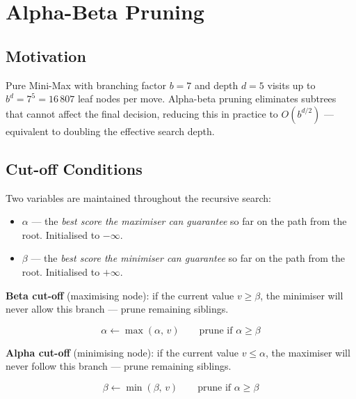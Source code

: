 \documentclass[12pt]{article}
\begin{document}
\section{Alpha-Beta Pruning}

\subsection{Motivation}

Pure Mini-Max with branching factor $b = 7$ and depth $d = 5$ visits up to
$b^d = 7^5 = 16\,807$ leaf nodes per move.  Alpha-beta pruning eliminates
subtrees that cannot affect the final decision, reducing this in practice to
$O(b^{d/2})$ --- equivalent to doubling the effective search depth.

\subsection{Cut-off Conditions}

Two variables are maintained throughout the recursive search:

\begin{itemize}
    \item $\alpha$ --- the \emph{best score the maximiser can guarantee} so
          far on the path from the root.  Initialised to $-\infty$.
    \item $\beta$  --- the \emph{best score the minimiser can guarantee} so
          far on the path from the root.  Initialised to $+\infty$.
\end{itemize}

\textbf{Beta cut-off} (maximising node): if the current value $v \geq \beta$,
the minimiser will never allow this branch --- prune remaining siblings.

\begin{equation}
\alpha \gets \max(\alpha,\, v) \qquad
\text{prune if } \alpha \geq \beta
\end{equation}

\textbf{Alpha cut-off} (minimising node): if the current value $v \leq \alpha$,
the maximiser will never follow this branch --- prune remaining siblings.

\begin{equation}
\beta \gets \min(\beta,\, v) \qquad
\text{prune if } \alpha \geq \beta
\end{equation}
\end{document}
